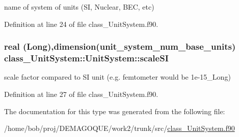 name of system of units (SI, Nuclear, BEC, etc) 



Definition at line 24 of file class\_\-UnitSystem.f90.

\hypertarget{typeclass__UnitSystem_1_1UnitSystem_ae45fad079edfabb5d09a78c707c76326}{
\subsubsection[{scaleSI}]{\setlength{\rightskip}{0pt plus 5cm}real (Long),dimension(unit\_\-system\_\-num\_\-base\_\-units) {\bf class\_\-UnitSystem::UnitSystem::scaleSI}}}
\label{typeclass__UnitSystem_1_1UnitSystem_ae45fad079edfabb5d09a78c707c76326}


scale factor compared to SI unit (e.g. femtometer would be 1e-\/15\_\-Long) 



Definition at line 27 of file class\_\-UnitSystem.f90.



The documentation for this type was generated from the following file:\begin{DoxyCompactItemize}
\item 
/home/bob/proj/DEMAGOQUE/work2/trunk/src/\hyperlink{class__UnitSystem_8f90}{class\_\-UnitSystem.f90}\end{DoxyCompactItemize}
